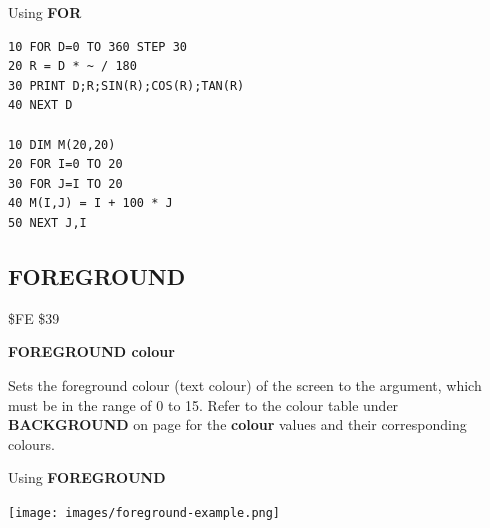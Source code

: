 \begin{description}[leftmargin=2cm,style=nextline]
\item [Examples:] Using {\bf FOR}
\begin{tcolorbox}[colback=black,coltext=white]
\verbatimfont{\codefont}
\begin{verbatim}
10 FOR D=0 TO 360 STEP 30
20 R = D * ~ / 180
30 PRINT D;R;SIN(R);COS(R);TAN(R)
40 NEXT D

10 DIM M(20,20)
20 FOR I=0 TO 20
30 FOR J=I TO 20
40 M(I,J) = I + 100 * J
50 NEXT J,I
\end{verbatim}
\end{tcolorbox}
\end{description}


\newpage
\subsection{FOREGROUND}
\begin{description}[leftmargin=2cm,style=nextline]
\item [Token:] \$FE \$39
\item [Format:] {\bf FOREGROUND colour}
\item [Usage:] Sets the foreground colour
               (text colour) of the screen to the argument,
               which must be in the
               range of 0 to 15.
               Refer to the colour table under
               {\bf BACKGROUND} on page \pageref{colourtable}
               for the {\bf colour} values and their corresponding colours.

\item [Example:] Using {\bf FOREGROUND}
\item \begin{center}\texttt{[image: images/foreground-example.png]}\end{center}
\end{description}


\newpage

